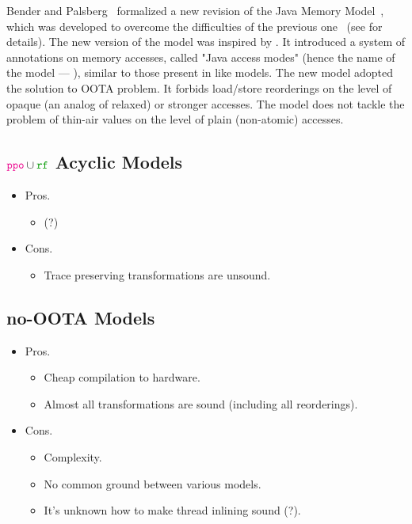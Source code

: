 Bender and Palsberg~\cite{Bender-Palsberg:OOPSLA19} formalized a new revision 
of the Java Memory Model~\cite{JDK9-VarHandle, JEP:193, JDK9-Modes}, 
which was developed to overcome 
the difficulties of the previous one~\cite{Manson-al:POPL05}
(see \cite{sec:prm-cert} for details).
The new version of the model was inspired by \RCMM. 
It introduced a system of annotations on memory accesses, 
called "Java access modes" (hence the name of the model --- \JAM),
similar to those present in \CMM like models.
The new model adopted the \RCMM solution to OOTA problem. 
It forbids load/store reorderings on the level of 
opaque (an analog of \CPP relaxed) or stronger accesses.
The model does not tackle the problem of 
thin-air values on the level of plain (\ie non-atomic) accesses.

\subsection{$\lPPO\cup\lRF$ Acyclic Models}
\label{sec:pporf-acyc}


\begin{itemize}
  \item Pros.
  \begin{itemize}
    \item (?)
  \end{itemize}
  \item Cons.
  \begin{itemize}
    \item Trace preserving transformations are unsound.
  \end{itemize}
\end{itemize}

\subsection{no-OOTA Models}
\label{sec:prm-cert}

\begin{itemize}
  \item Pros.
  \begin{itemize}
    \item Cheap compilation to hardware.
    \item Almost all transformations are sound (including all reorderings). 
  \end{itemize}
  \item Cons.
  \begin{itemize}
    \item Complexity.
    \item No common ground between various models.
    \item It's unknown how to make thread inlining sound (?).
  \end{itemize}
\end{itemize}

